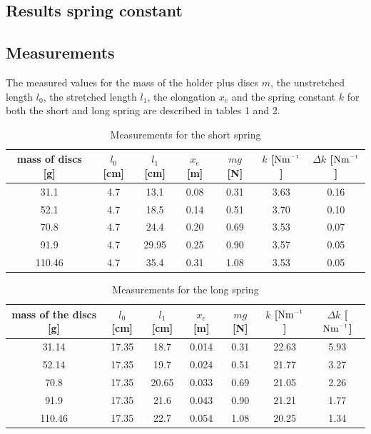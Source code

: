 \documentclass[a4paper, 10pt]{article}
\newcommand{\inv}{^{\raisebox{.2ex}{$\scriptscriptstyle-1$}}}
\begin{document}
\begin{justify}
\section{Results spring constant}
\subsection{Measurements}
The measured values for the mass of the holder plus discs $m$, the unstretched
length $l_0$, the stretched length $l_1$, the elongation $x_e$ and the spring
constant $k$ for both the short and long spring are described in tables 1 and 2.
\begin{table}[!h]
    \centering
    \caption{Measurements for the short spring}
    \label{tab:1}
    \begin{tabular}{|c|c|c|c|c|c|c|} 
    \hline
    mass of discs [g] & $l_0$ [cm] & $l_1$ [cm] & $x_e$ [m] &
    $mg$ [N]  & $k$ [$\mathrm{Nm\inv}$] & $\Delta k$ [$\mathrm{Nm\inv}$]  \\ 
    \hline
    31.1                              & 4.7     & 13.1    & 0.08   & 0.31 & 3.63     & 0.16    \\ 
    \hline
    52.1                              & 4.7     & 18.5    & 0.14   & 0.51 & 3.70     & 0.10    \\ 
    \hline
    70.8                               & 4.7     & 24.4    & 0.20   & 0.69 & 3.53     & 0.07    \\ 
    \hline
    91.9                               & 4.7     & 29.95   & 0.25  & 0.90 & 3.57     & 0.05   \\ 
    \hline
    110.46                             & 4.7     & 35.4    & 0.31   & 1.08 & 3.53     & 0.05     \\
    \hline
    \end{tabular}
\end{table}
\begin{table}[!h]
    \centering
    \caption{Measurements for the long spring}
    \begin{tabular}{|c|c|c|c|c|c|c|} 
    \hline
    mass of the discs [g] & $l_0$ [cm] & $l_1$ [cm] & $x_e$ [m] & $mg$ [N]  &
    $k$ [$\mathrm{Nm\inv}$] & $\Delta k$ [$\mathrm{Nm     \inv}$]        \\ 
    \hline
    31.14                 & 17.35   & 18.7    & 0.014 & 0.31 & 22.63      & 5.93  \\ 
    \hline
    52.14                 & 17.35   & 19.7    & 0.024 & 0.51 & 21.77     & 3.27 \\ 
    \hline
    70.8                  & 17.35   & 20.65   & 0.033  & 0.69 & 21.05     & 2.26  \\ 
    \hline
    91.9                  & 17.35   & 21.6    & 0.043 & 0.90 & 21.21     & 1.77  \\ 
    \hline
    110.46                & 17.35   & 22.7    & 0.054 & 1.08 & 20.25     & 1.34  \\
    \hline
    \end{tabular}
\end{table}
\newpage

\end{justify}
\end{document}
